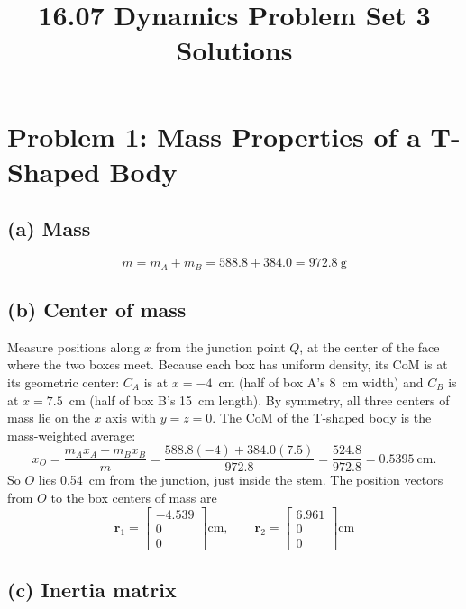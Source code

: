 \documentclass[11pt,letterpaper]{article}
\title{16.07 Dynamics Problem Set 3 Solutions}
\author{}
\date{}
\begin{document}
\maketitle
\vspace{-1.5cm}


\section*{Problem 1: Mass Properties of a T-Shaped Body}

\subsection*{(a) Mass}

\[
m = m_A + m_B = 588.8 + 384.0 = \boxed{972.8~\text{g}}
\]

\subsection*{(b) Center of mass}

Measure positions along $x$ from the junction point $Q$, at the center of the face where the two boxes meet. Because each box has uniform density, its CoM is at its geometric center: $C_A$ is at $x = -4$~cm (half of box A's 8~cm width) and $C_B$ is at $x = 7.5$~cm (half of box B's 15~cm length). By symmetry, all three centers of mass lie on the $x$ axis with $y = z = 0$. The CoM of the T-shaped body is the mass-weighted average:
\[
x_O = \frac{m_A x_A + m_B x_B}{m} = \frac{588.8(-4) + 384.0(7.5)}{972.8} = \frac{524.8}{972.8} = 0.5395~\text{cm}.
\]
So $O$ lies 0.54~cm from the junction, just inside the stem. The position vectors from $O$ to the box centers of mass are
\[
\boxed{\mathbf{r}_1 = \begin{bmatrix} -4.539 \\ 0 \\ 0 \end{bmatrix}\text{cm}},
\qquad
\boxed{\mathbf{r}_2 = \begin{bmatrix} 6.961 \\ 0 \\ 0 \end{bmatrix}\text{cm}}
\]

\subsection*{(c) Inertia matrix}
\end{document}

